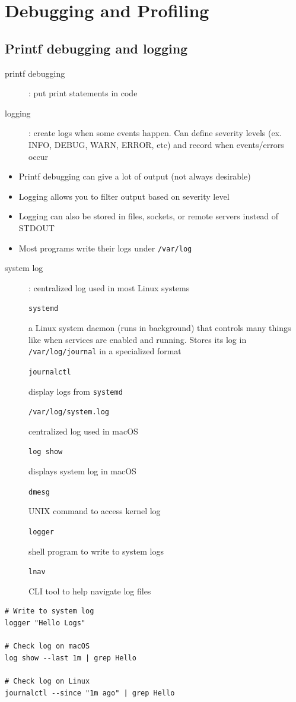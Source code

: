 \documentclass[letterpaper,12pt]{article}
\newcommand*{\lstitem}[1]{
  \setbox0\hbox{\lstinline{#1}}
  \item[\usebox0]
}
\begin{document}
\section{Debugging and Profiling}

\subsection{Printf debugging and logging}
\begin{description}
 \item[printf debugging]: put print statements in code
 \item[logging]: create logs when some events happen. Can define severity levels (ex. INFO, DEBUG, WARN, ERROR, etc) and record when events/errors occur
\end{description}
\begin{itemize}
 \item Printf debugging can give a lot of output (not always desirable)
 \item Logging allows you to filter output based on severity level
 \item Logging can also be stored in files, sockets, or remote servers instead of STDOUT
 \item Most programs write their logs under \lstinline{/var/log}
\end{itemize}

\begin{description}
 \item[system log]: centralized log used in most Linux systems
       \lstitem{systemd} a Linux system daemon (runs in background) that controls many things like when services are enabled and running. Stores its log in \lstinline{/var/log/journal} in a specialized format
       \lstitem{journalctl} display logs from \lstinline{systemd}
       \lstitem{/var/log/system.log} centralized log used in macOS
       \lstitem{log show} displays system log in macOS
       \lstitem{dmesg} UNIX command to access kernel log
       \lstitem{logger} shell program to write to system logs
       \lstitem{lnav} CLI tool to help navigate log files
\end{description}

\begin{lstlisting}
# Write to system log
logger "Hello Logs"

# Check log on macOS
log show --last 1m | grep Hello

# Check log on Linux
journalctl --since "1m ago" | grep Hello
\end{lstlisting}
\end{document}
